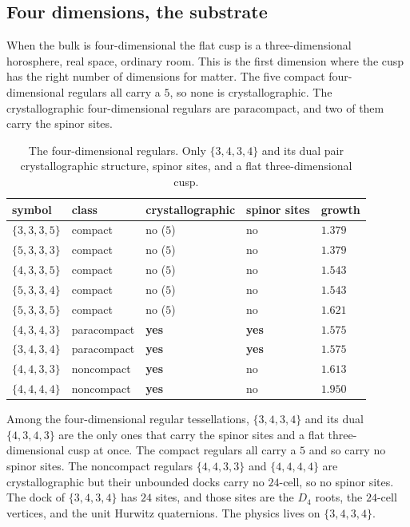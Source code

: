 \subsection{Four dimensions, the substrate}

When the bulk is four-dimensional the flat cusp is a three-dimensional horosphere, real space, ordinary room. This is the first dimension where the cusp has the right number of dimensions for matter. The five compact four-dimensional regulars all carry a $5$, so none is crystallographic. The crystallographic four-dimensional regulars are paracompact, and two of them carry the spinor sites.

\begin{table}[ht]
\centering
\begin{tabular}{@{}lllll@{}}
\toprule
symbol & class & crystallographic & spinor sites & growth \\
\midrule
$\{3,3,3,5\}$ & compact & no ($5$) & no & $1.379$ \\
$\{5,3,3,3\}$ & compact & no ($5$) & no & $1.379$ \\
$\{4,3,3,5\}$ & compact & no ($5$) & no & $1.543$ \\
$\{5,3,3,4\}$ & compact & no ($5$) & no & $1.543$ \\
$\{5,3,3,5\}$ & compact & no ($5$) & no & $1.621$ \\
$\{4,3,4,3\}$ & paracompact & \textbf{yes} & \textbf{yes} & $1.575$ \\
$\{3,4,3,4\}$ & paracompact & \textbf{yes} & \textbf{yes} & $1.575$ \\
$\{4,4,3,3\}$ & noncompact & \textbf{yes} & no & $1.613$ \\
$\{4,4,4,4\}$ & noncompact & \textbf{yes} & no & $1.950$ \\
\bottomrule
\end{tabular}
\caption{The four-dimensional regulars. Only $\{3,4,3,4\}$ and its dual pair crystallographic structure, spinor sites, and a flat three-dimensional cusp.}
\label{tab:catalog-4d}
\end{table}

\begin{theorem}
Among the four-dimensional regular tessellations, $\{3,4,3,4\}$ and its dual $\{4,3,4,3\}$ are the only ones that carry the spinor sites and a flat three-dimensional cusp at once. The compact regulars all carry a $5$ and so carry no spinor sites. The noncompact regulars $\{4,4,3,3\}$ and $\{4,4,4,4\}$ are crystallographic but their unbounded docks carry no $24$-cell, so no spinor sites. The dock of $\{3,4,3,4\}$ has $24$ sites, and those sites are the $D_4$ roots, the $24$-cell vertices, and the unit Hurwitz quaternions. The physics lives on $\{3,4,3,4\}$.
\end{theorem}

